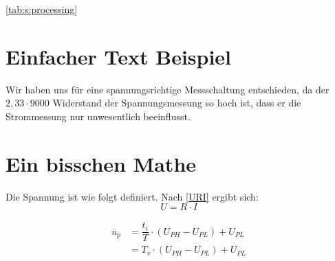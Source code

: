 

	
	
	
	
	
% 



\tableofcontents
\newpage

\autoref{tab:s:processing}
\section{Einfacher Text Beispiel}
Wir haben uns für eine spannungsrichtige Messschaltung entschieden, da der $ 2,33 \cdot 9000 $ Widerstand der Spannungsmessung so hoch ist, dass er die Strommessung nur unwesentlich beeinflusst.

\section{Ein bisschen Mathe}
Die Spannung ist wie folgt definiert. Nach \autoref{URI} ergibt sich:
\begin{equation}
	U = R \cdot I \label{URI}
\end{equation}

\begin{align}
	\overline{u}_p & = \dfrac{t_{i}}{T} \cdot (U_{PH}-U_{PL}) + U_{PL} \\
	& = T_{v} \cdot (U_{PH}-U_{PL}) + U_{PL}
\end{align}


